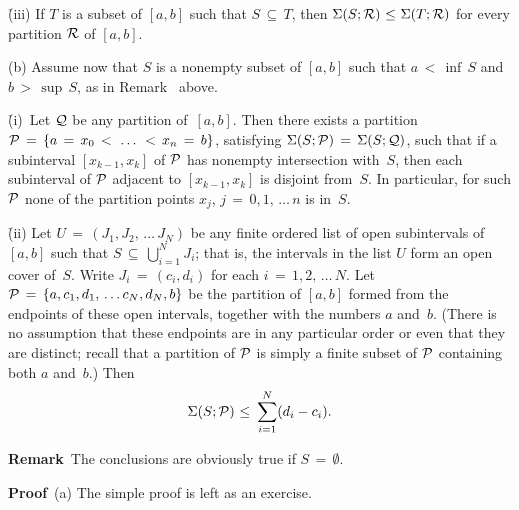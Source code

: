 \VA

       \h (iii) If $T$ is a subset of $[a,b]$ such that $S \,{\subseteq}\, T$, then ${\Sigma}(S;{\cal R})\,\,{\leq}\,\,{\Sigma}(T;{\cal R})$ for every partition ${\cal R}$ of $[a,b]$.

\V


        (b) Assume now that $S$ is a nonempty subset of $[a,b]$ such that $a\,<\,{\inf}\,S$ and $b\,>\,{\sup}\,S$, as in Remark~ above.

\VA


    \h (i)\, Let ${\cal Q}$ be any partition of~$[a,b]$. Then there exists a partition~${\cal P} \,=\, \{a \,=\, x_{0}\,<\,\,{\ldots}\,\,<\,x_{n} \,=\, b\}$,
    satisfying ${\Sigma}(S;{\cal P}) \,=\, {\Sigma}(S;{\cal Q})$, such that if a subinterval $[x_{k-1},x_{k}]$ of ${\cal P}$ has nonempty intersection with~$S$,
    then each subinterval of ${\cal P}$ adjacent to $[x_{k-1},x_{k}]$ is disjoint from~$S$. In particular,
    for such ${\cal P}$ none of the partition points $x_{j}$, $j \,=\, 0,1,\,{\ldots}\,n$ is in~$S$.

\VA

        \h (ii) Let $U \,=\, (J_{1}, J_{2},\,{\ldots}\,J_{N})$ be any finite ordered list of open subintervals of $[a,b]$ such that $S \,{\subseteq}\, {\bigcup}_{i=1}^{N} J_{i}$;
    that is, the intervals in the list $U$ form an open cover of~$S$. Write $J_{i} \,=\, (c_{i},d_{i})$ for each $i \,=\, 1,2,\,{\ldots}\,N$.
    Let ${\cal P} \,=\, \{a, c_{1}, d_{1},\,{\ldots}\,c_{N}, d_{N}, b\}$ be the partition of $[a,b]$ formed from the endpoints of these open intervals, together with the numbers $a$ and~$b$.
    (There is no assumption that these endpoints are in any particular order or even that they are distinct; recall that a partition of ${\cal P}$ is simply a finite subset of ${\cal P}$ containing both $a$ and~$b$.)
    Then
        \begin{displaymath}
        {\Sigma}(S;{\cal P})\,\,{\leq}\,\,\sum_{i=1}^{N} (d_{i}-c_{i}).
        \end{displaymath}

\V

        {\bf Remark}\, The conclusions are obviously true if $S \,=\, {\emptyset}$.

\V

        {\bf Proof}\, (a) The simple proof is left as an exercise. %

\V

